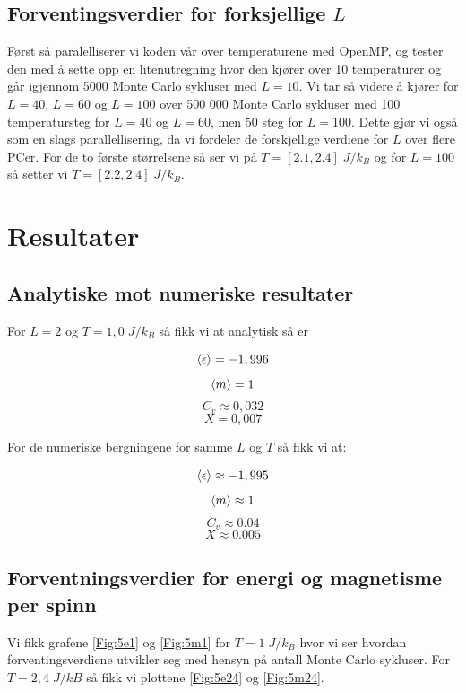 \documentclass[reprint,english,notitlepage]{revtex4-2}  %
\begin{document}
\subsection*{Forventingsverdier for forksjellige $L$}

Først så paralelliserer vi koden vår over temperaturene med OpenMP, og tester den med å sette opp en litenutregning hvor den kjører over 10 temperaturer og går igjennom 5000 Monte Carlo sykluser med $L = 10$. Vi tar så videre å kjører for $L = 40$, $L = 60$ og $L = 100$ over 500 000 Monte Carlo sykluser med 100 temperatursteg for $L = 40$ og $L = 60$, men 50 steg for $L = 100$. Dette gjør vi også som en slags parallellisering, da vi fordeler de forskjellige verdiene for $L$ over flere PCer. For de to første størrelsene så ser vi på $T = [2.1, 2.4] \; J/k_B$ og for $L = 100$ så setter vi $T = [2.2, 2.4] \; J/k_B$.

\section{Resultater}

\subsection*{Analytiske mot numeriske resultater}

For $L = 2$ og $T = 1,0 \; J/k_B$ så fikk vi at analytisk så er

$$ \expval{\epsilon} = -1,996 $$
$$ \expval{m} =  1 $$
$$ C_v  \approx 0,032 $$
$$ X = 0,007$$

For de numeriske bergningene for samme $L$ og $T$ så fikk vi at:

$$ \expval{\epsilon} \approx -1,995 $$
$$ \expval{m} \approx 1$$
$$ C_v \approx 0.04$$
$$ X \approx 0.005$$


\subsection*{Forventningsverdier for energi og magnetisme per spinn}

Vi fikk grafene \autoref{Fig:5e1} og \autoref{Fig:5m1} for $T =  1 \; J/k_B $ hvor vi ser hvordan forventingsverdiene utvikler seg med hensyn på antall Monte Carlo sykluser. For $T = 2,4 \; J/kB$ så fikk vi plottene \autoref{Fig:5e24} og \autoref{Fig:5m24}.
\end{document}
